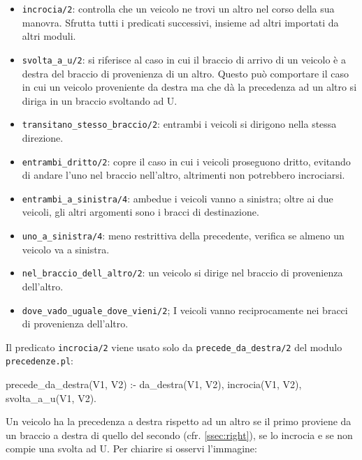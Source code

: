 \begin{itemize}
	\item \texttt{incrocia/2}: controlla che un veicolo ne trovi un altro nel corso della sua manovra. Sfrutta tutti i predicati successivi, insieme ad altri importati da altri moduli.
	
	\item \texttt{svolta\_a\_u/2}: si riferisce al caso in cui il braccio di arrivo di un veicolo è a destra del braccio di provenienza di un altro. Questo può comportare il caso in cui un veicolo proveniente da destra ma che dà la precedenza ad un altro si diriga in un braccio svoltando ad U.
	
	\item \texttt{transitano\_stesso\_braccio/2}: entrambi i veicoli si dirigono nella stessa direzione.
	
	\item \texttt{entrambi\_dritto/2}: copre il caso in cui i veicoli proseguono dritto, evitando di andare l'uno nel braccio nell'altro, altrimenti non potrebbero incrociarsi.
	
	\item \texttt{entrambi\_a\_sinistra/4}: ambedue i veicoli vanno a sinistra; oltre ai due veicoli, gli altri argomenti sono i bracci di destinazione.
	
	\item \texttt{uno\_a\_sinistra/4}: meno restrittiva della precedente, verifica se almeno un veicolo va a sinistra.
	
	\item \texttt{nel\_braccio\_dell\_altro/2}: un veicolo si dirige nel braccio di provenienza dell'altro.
	
	\item \texttt{dove\_vado\_uguale\_dove\_vieni/2}; I veicoli vanno reciprocamente nei bracci di provenienza dell'altro.
\end{itemize}

Il predicato \texttt{incrocia/2} viene usato solo da \texttt{precede\_da\_destra/2} del modulo \texttt{precedenze.pl}:

\begin{verbatimtab}
precede_da_destra(V1, V2) :-
	da_destra(V1, V2),
	incrocia(V1, V2),
	\+ svolta_a_u(V1, V2).
\end{verbatimtab}

Un veicolo ha la precedenza a destra rispetto ad un altro se il primo proviene da un braccio a destra di quello del secondo (cfr. \ref{ssec:right}), se lo incrocia e se non compie una svolta ad U. Per chiarire si osservi l'immagine:

